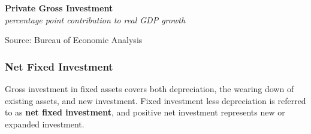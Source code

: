 \documentclass{report}
\makeatletter
\newcommand{\tbllink}[1]{\href{https://raw.githubusercontent.com/bdecon/US-chartbook/master/chartbook/data/#1}{\faTable}}
\newcommand*\short[1]{\expandafter\@gobbletwo\number\numexpr#1\relax}
\newcommand{\sbar}[4]{
		\addplot[ybar stacked, bar width=2.45pt, draw opacity=0, fill=#1] 
			table [x=#2, y=#3, col sep=comma]{#4};}
\newcommand{\dateaxisticks}{
		date coordinates in=x, axis line style={draw=none},
		xmax={2022-03-15},
		max space between ticks=40,	    
		xtick={{1990-01-01}, {1992-01-01}, {1994-01-01}, 
			{1996-01-01}, {1998-01-01}, {2000-01-01}, 
			{2002-01-01}, {2004-01-01}, {2006-01-01},
			{2008-01-01}, {2010-01-01}, {2012-01-01}, {2014-01-01},
		    {2016-01-01}, {2018-01-01}, {2020-01-01}, {2022-01-01}, 
		    {2024-01-01}, {2026-01-01}},
		minor xtick={{1989-01-01}, {1991-01-01}, {1993-01-01},
			{1995-01-01}, {1997-01-01}, {1999-01-01}, 
			{2001-01-01}, {2003-01-01}, {2005-01-01}, {2007-01-01},
		    {2009-01-01}, {2011-01-01}, {2013-01-01}, {2015-01-01},
		    {2017-01-01}, {2019-01-01}, {2021-01-01}, {2023-01-01}, 
		    {2025-01-01}, {2027-01-01}},
		enlarge y limits={0.06}, enlarge x limits={0.01},
		}
\newcommand{\bbar}[2]{extra #1 ticks = {{#2}}, extra #1 tick labels = ,
		extra #1 tick style = {grid=major, grid style={thick, black!25}},}
\newcommand{\rbars}{
		\fill[color=black!10] (axis cs:{1990-07-01},\pgfkeysvalueof{/pgfplots/ymin}) rectangle 
			(axis cs:{1991-03-01}, \pgfkeysvalueof{/pgfplots/ymax});
		\fill[color=black!10] (axis cs:{2007-12-01},\pgfkeysvalueof{/pgfplots/ymin}) rectangle 
			(axis cs:{2009-07-01}, \pgfkeysvalueof{/pgfplots/ymax});
		\fill[color=black!10] (axis cs:{2001-03-01},\pgfkeysvalueof{/pgfplots/ymin}) rectangle 
			(axis cs:{2001-11-01}, \pgfkeysvalueof{/pgfplots/ymax});
		\fill[color=black!10] (axis cs:{2020-02-01},\pgfkeysvalueof{/pgfplots/ymin}) rectangle 
			(axis cs:{2020-05-01}, \pgfkeysvalueof{/pgfplots/ymax});}
\makeatother
\begin{document}
{\begin{minipage}{0.76\textwidth}
 
\vspace{2mm} 

\normalsize \textbf{Private Gross Investment}\\
\footnotesize{\textit{percentage point contribution to real GDP growth}}
\vspace{5.2cm}

\hspace{4mm} 

\footnotesize{Source: Bureau of Economic Analysis} \hfill \tbllink{inv.csv} 
\end{minipage}
\newpage
\begin{minipage}{0.76\textwidth}
\subsubsection*{Net Fixed Investment}
\vspace{-1.5mm}
\small Gross investment in fixed assets covers both depreciation, the wearing down of existing assets, and new investment. Fixed investment less depreciation is referred to as \textbf{net fixed investment}, and positive net investment represents new or expanded investment. 


\end{minipage}}
\end{document}
